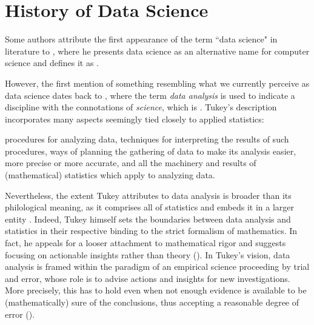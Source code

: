 \section{History of Data Science}
\label{sec:historyDS}

Some authors attribute the first appearance of the term ``data science" in literature
to , where he presents data science as an alternative name for computer science and defines it as .


However, the first mention of something resembling what we currently perceive as data science dates back to , where the term \emph{data analysis} is used to indicate a discipline with the connotations of \emph{science}, which is . 
Tukey's description incorporates many aspects seemingly tied closely to applied statistics: 
\begin{displayquote}
procedures for analyzing data, techniques for interpreting the results of such procedures, ways of planning the gathering of data to make its analysis easier, more precise or more accurate, and all the machinery and results of (mathematical) statistics which apply to analyzing data.
\end{displayquote}
Nevertheless, the extent Tukey attributes to data analysis is broader than its philological meaning, as it comprises all of statistics and embeds it in a larger entity \cite{huber2012data, donoho201750years}.
Indeed, Tukey himself sets the boundaries between data analysis and statistics in their respective binding to the strict formalism of mathematics.
In fact, he appeals for a looser attachment to mathematical rigor and suggests focusing on actionable insights rather than theory ().
In Tukey's vision, data analysis is framed within the paradigm of an empirical science proceeding by trial and error, whose role is to advise actions and insights for new investigations.
More precisely, this has to hold even when not enough evidence is available to be (mathematically) sure of the conclusions, thus accepting a reasonable degree of error ().
